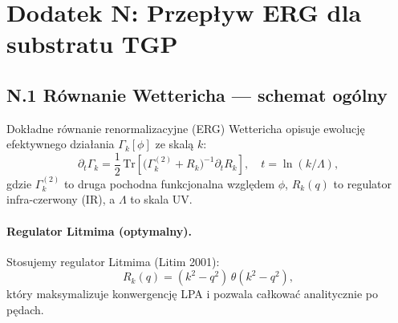 %
%
%
%

\section*{Dodatek N: Przepływ ERG dla substratu TGP}
\label{app:ERG}

\subsection*{N.1 Równanie Wettericha — schemat ogólny}

Dokładne równanie renormalizacyjne (ERG) Wettericha opisuje ewolucję
efektywnego działania $\Gamma_k[\phi]$ ze skalą $k$:
\begin{equation}
  \partial_t \Gamma_k = \frac{1}{2}\,
    \mathrm{Tr}\!\left[
      \bigl(\Gamma_k^{(2)} + R_k\bigr)^{-1}\partial_t R_k
    \right],
  \quad t = \ln(k/\Lambda),
  \label{eq:Wetterich}
\end{equation}
gdzie $\Gamma_k^{(2)}$ to druga pochodna funkcjonalna względem $\phi$,
$R_k(q)$ to regulator infra-czerwony (IR), a $\Lambda$ to skala UV.

\paragraph{Regulator Litmima (optymalny).}
Stosujemy regulator Litmima (Litim 2001):
\begin{equation}
  R_k(q) = (k^2 - q^2)\,\theta(k^2 - q^2),
  \label{eq:Litim_regulator}
\end{equation}
który maksymalizuje konwergencję LPA i pozwala całkować analitycznie
po pędach.

